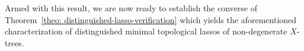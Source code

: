 %
%
%
%
Armed with this result, we are now ready to establish the converse of 
Theorem~\ref{theo: distinguished-lasso-verification} which yields the
aforementioned characterization of distinguished
minimal topological lassos of non-degenerate $X$-trees.

